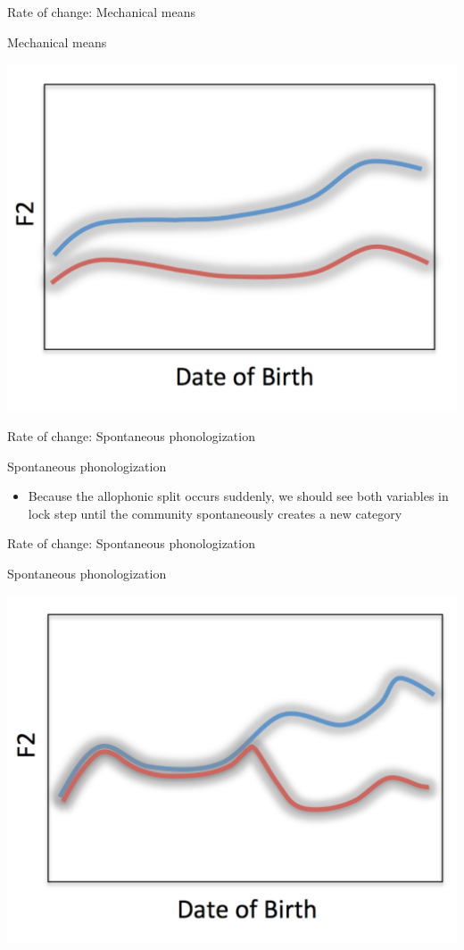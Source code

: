 \documentclass[hyperref={pdfpagelabels=false}]{beamer}
\begin{document}
\begin{frame}{Rate of change: Mechanical means}
	\begin{block}{Mechanical means}
		\begin{center}
		\includegraphics[trim=2cm 2cm 2cm 2cm, clip=false, width=.6\textwidth]{MechROC.pdf}
		\end{center}
	\end{block}	
\end{frame}

\begin{frame}{Rate of change: Spontaneous phonologization}
	\begin{block}{Spontaneous phonologization}
		\begin{itemize}
			\item Because the allophonic split occurs suddenly, we should see both variables in lock step until the community spontaneously creates a new category 
		\end{itemize}
	\end{block}
\end{frame}

\begin{frame}{Rate of change: Spontaneous phonologization}
	\begin{block}{Spontaneous phonologization}
		\begin{center}
		\includegraphics[trim=2cm 2cm 2cm 2cm, clip=false, width=.6\textwidth]{SpontROC.pdf}
		\end{center}
	\end{block}	
\end{frame}
\end{document}
